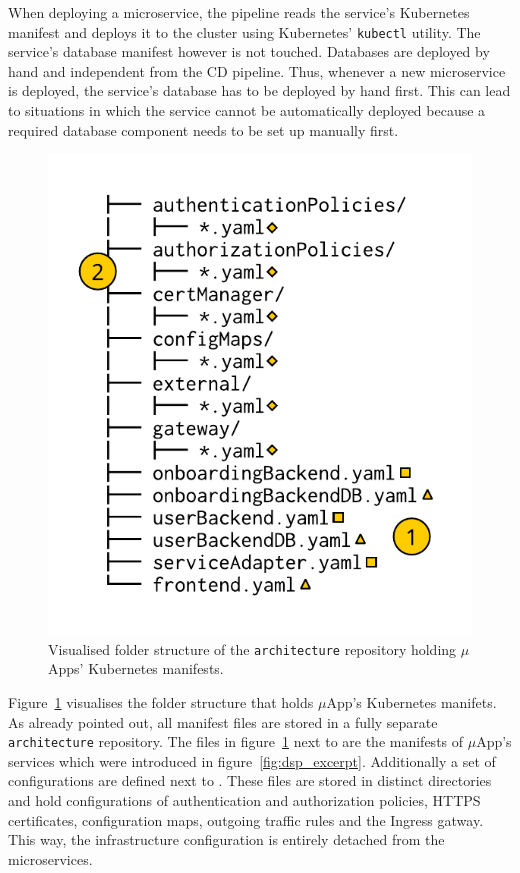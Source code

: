 When deploying a microservice, the pipeline reads the service's Kubernetes
manifest and deploys it to the cluster using Kubernetes' \texttt{kubectl}
utility. The service's database manifest however is not touched. Databases are
deployed by hand and independent from the \ac{CD} pipeline. Thus, whenever a new
microservice is deployed, the service's database has to be deployed by hand
first. This can lead to situations in which the service cannot be
automatically deployed because a required database component needs to be set up
manually first.

\begin{figure}[H]
\begin{center}
  \includegraphics[scale=0.8]{images/figures/manifests_folder_naive.pdf}
\end{center}
\caption{Visualised folder structure of the \texttt{architecture} repository
holding $\mu$Apps' Kubernetes manifests.}%
\label{fig:manifests_folder_naive}
\end{figure}

Figure~\ref{fig:manifests_folder_naive} visualises the folder structure that
holds $\mu$App's Kubernetes manifets. As already pointed out, all manifest
files are stored in a fully separate \texttt{architecture} repository. The files in
figure~\ref{fig:manifests_folder_naive} next to  are the manifests
of $\mu$App's services which were introduced in figure~\ref{fig:dsp_excerpt}.
Additionally a set of configurations are defined next to . These
files are stored in distinct directories and hold configurations of
authentication and authorization policies, \ac{HTTPS} certificates,
configuration maps, outgoing traffic rules and the Ingress gatway. This way,
the infrastructure configuration is entirely detached from the microservices.

